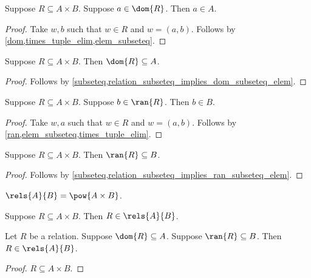 \begin{proposition}\label{relation_subseteq_implies_dom_subseteq_elem}
    Suppose $R\subseteq A\times B$.
    Suppose $a\in\dom{R}$.
    Then $a\in A$.
\end{proposition}
\begin{proof}
    Take $w, b$ such that $w\in R$ and $w = (a, b)$.
    Follows by \cref{dom,times_tuple_elim,elem_subseteq}.
\end{proof}

\begin{proposition}\label{relation_subseteq_implies_dom_subseteq}
    Suppose $R\subseteq A\times B$.
    Then $\dom{R}\subseteq A$.
\end{proposition}
\begin{proof}
    Follows by \cref{subseteq,relation_subseteq_implies_dom_subseteq_elem}.
\end{proof}

\begin{proposition}\label{relation_subseteq_implies_ran_subseteq_elem}
    Suppose $R\subseteq A\times B$.
    Suppose $b\in\ran{R}$.
    Then $b\in B$.
\end{proposition}
\begin{proof}
    Take $w, a$ such that $w\in R$ and $w = (a, b)$.
    Follows by \cref{ran,elem_subseteq,times_tuple_elim}.
\end{proof}

\begin{proposition}\label{relation_subseteq_implies_ran_subseteq}
    Suppose $R\subseteq A\times B$.
    Then $\ran{R}\subseteq B$.
\end{proposition}
\begin{proof}
    Follows by \cref{subseteq,relation_subseteq_implies_ran_subseteq_elem}.
\end{proof}

\begin{definition}\label{rels}
    $\rels{A}{B} = \pow{A\times B}$.
\end{definition}

\begin{proposition}\label{rels_intro}
    Suppose $R\subseteq A\times B$.
    Then $R\in\rels{A}{B}$.
\end{proposition}

\begin{proposition}\label{rels_intro_dom_and_ran}
    Let $R$ be a relation.
    Suppose $\dom{R}\subseteq A$.
    Suppose $\ran{R}\subseteq B$.
    Then $R\in\rels{A}{B}$.
\end{proposition}
\begin{proof}
    $R\subseteq A\times B$.
\end{proof}

